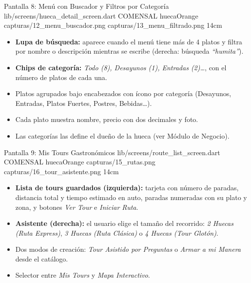 \pantalladoble
  {Pantalla 8: Menú con Buscador y Filtros por Categoría}
  {lib/screens/hueca_detail_screen.dart}
  {COMENSAL}
  {huecaOrange}
  {capturas/12_menu_buscador.png}
  {capturas/13_menu_filtrado.png}
  {14cm}
  {
    \begin{itemize}[leftmargin=*, itemsep=2pt]
      \item \textbf{Lupa de búsqueda:} aparece cuando el menú tiene más de 4 platos y filtra por nombre o descripción mientras se escribe (derecha: búsqueda \textit{``humita''}).
      \item \textbf{Chips de categoría:} \textit{Todo (8), Desayunos (1), Entradas (2)\dots}, con el número de platos de cada una.
      \item Platos agrupados bajo encabezados con ícono por categoría (Desayunos, Entradas, Platos Fuertes, Postres, Bebidas\dots).
      \item Cada plato muestra nombre, precio con dos decimales y foto.
      \item Las categorías las define el dueño de la hueca (ver Módulo de Negocio).
    \end{itemize}
  }

\pantalladoble
  {Pantalla 9: Mis Tours Gastronómicos}
  {lib/screens/route\_list\_screen.dart}
  {COMENSAL}
  {huecaOrange}
  {capturas/15_rutas.png}
  {capturas/16_tour_asistente.png}
  {14cm}
  {
    \begin{itemize}[leftmargin=*, itemsep=2pt]
      \item \textbf{Lista de tours guardados (izquierda):} tarjeta con número de paradas, distancia total y tiempo estimado en auto, paradas numeradas con su plato y zona, y botones \textit{Ver Tour} e \textit{Iniciar Ruta}.
      \item \textbf{Asistente (derecha):} el usuario elige el tamaño del recorrido: \textit{2 Huecas (Ruta Express)}, \textit{3 Huecas (Ruta Clásica)} o \textit{4 Huecas (Tour Glotón)}.
      \item Dos modos de creación: \textit{Tour Asistido por Preguntas} o \textit{Armar a mi Manera} desde el catálogo.
      \item Selector entre \textit{Mis Tours} y \textit{Mapa Interactivo}.
    \end{itemize}
  }

